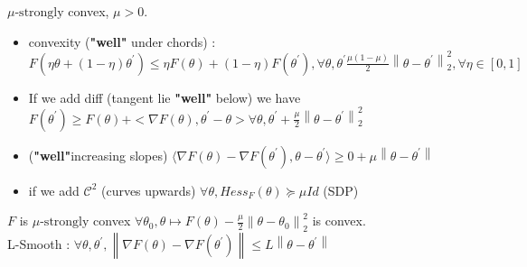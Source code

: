 $ \mu \text{-strongly}$ convex, $ \mu > 0 $. 
\begin{itemize}
    \item convexity (\textbf{"well"} under chords) : $ F(\eta \theta + (1 - \eta ) \theta ^\prime ) \leq  \eta F(\theta ) + (1 - \eta ) F(\theta ^\prime ), \forall \theta , \theta ^\prime \frac{\mu (1 - \mu )}{2} \left\| \theta - \theta ^\prime  \right\| ^2 _2 , \forall \eta  \in 
    [0, 1] $ 
    \item If we add diff (tangent lie \textbf{"well"} below) we have $ F(\theta ^\prime ) \geq F(\theta ) + < \nabla F(\theta ) , \theta ^\prime - \theta  > \forall \theta , \theta ^\prime + \frac{\mu }{2} \left\| \theta - \theta ^\prime  \right\|^2_2 $ 
    \item (\textbf{"well"}increasing slopes) $ \langle \nabla F(\theta ) - \nabla F(\theta ^\prime ), \theta - \theta ^\prime \rangle \geq 0 + \mu \left\| \theta - \theta ^\prime  \right\|  $
    \item if we add $ \mathcal{C}^2 $ (curves upwards) $ \forall \theta , Hess_F (\theta ) \succeq \mu Id $ (SDP)
\end{itemize}
$ F $ is $ \mu \text{-strongly} $ convex $ \forall \theta _0, \theta \mapsto F(\theta ) - \frac{\mu }{2} \left\| \theta  - \theta _0 \right\|^2 _2 $ is convex. \\
L-Smooth : $ \forall \theta , \theta ^\prime, \left\| \nabla F(\theta ) - \nabla F(\theta ^\prime ) \right\| \leq  L \left\| \theta - \theta ^\prime  \right\| $ 

